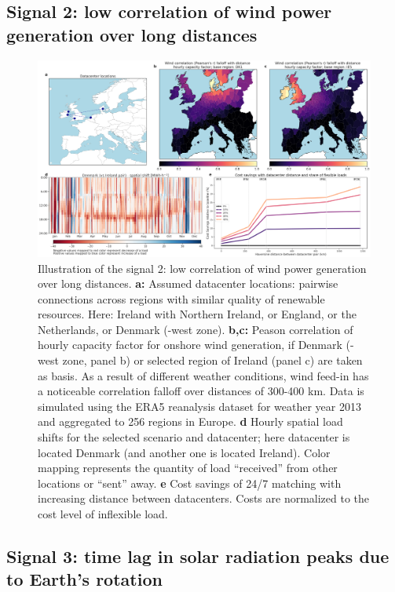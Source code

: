 \subsection{Signal 2: low correlation of wind power generation over long distances}

\begin{figure}
    \centering
    \includegraphics[width=\textwidth]{img/dashboard_2.png}
    \caption{Illustration of the signal 2: low correlation of wind power generation over long distances.
    \textbf{a:} Assumed datacenter locations: pairwise connections across regions with similar quality of renewable resources. Here: Ireland with Northern Ireland, or England, or the Netherlands, or Denmark (-west zone).
    \textbf{b,c:} Peason correlation of hourly capacity factor for onshore wind generation, if Denmark (-west zone, panel b) or selected region of Ireland (panel c) are taken as basis. As a result of different weather conditions, wind feed-in has a noticeable correlation falloff over distances of 300-400 km. Data is simulated using the ERA5 reanalysis dataset for weather year 2013 and aggregated to 256 regions in Europe.
    \textbf{d} Hourly spatial load shifts for the selected scenario and datacenter; here datacenter is located Denmark (and another one is located Ireland). Color mapping represents the quantity of load \enquote{received} from other locations or \enquote{sent} away.
    \textbf{e} Cost savings of 24/7 matching with increasing distance between datacenters. Costs are normalized to the cost level of inflexible load.}
    \label{fig:dashboard2}
\end{figure}


\subsection{Signal 3: time lag in solar radiation peaks due to Earth's rotation}

